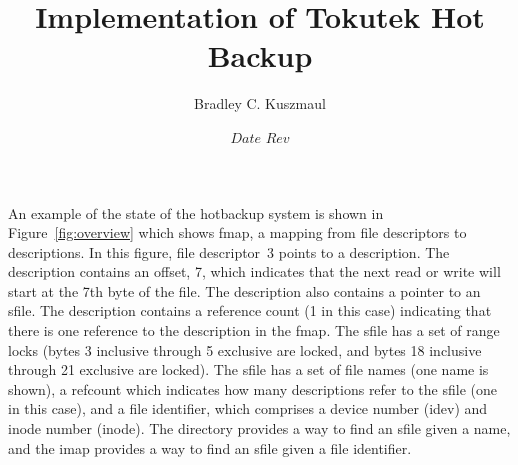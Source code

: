 \documentclass[10pt]{article}
\title{Implementation of Tokutek Hot Backup}
\author{Bradley C. Kuszmaul}
\date{$Date$  $Rev$}
\newcommand{\figref}[1]{Figure~\ref{fig:#1}}
\begin{document}
\maketitle

An example of the state of the hotbackup system is shown in
\figref{overview} which shows fmap, a mapping from file descriptors to
descriptions.  In this figure, file descriptor~3 points to a
description.  The description contains an offset, 7, which indicates
that the next read or write will start at the 7th byte of the file.
The description also contains a pointer to an sfile.  The description
contains a reference count (1 in this case) indicating that there is
one reference to the description in the fmap.  The sfile has a set of
range locks (bytes 3 inclusive through 5 exclusive are locked, and
bytes 18 inclusive through 21 exclusive are locked).  The sfile has a
set of file names (one name is shown), a refcount which indicates how
many descriptions refer to the sfile (one in this case), and a file
identifier, which comprises a device number (idev) and inode number
(inode).  The directory provides a way to find an sfile given a name,
and the imap provides a way to find an sfile given a file identifier.
\end{document}

